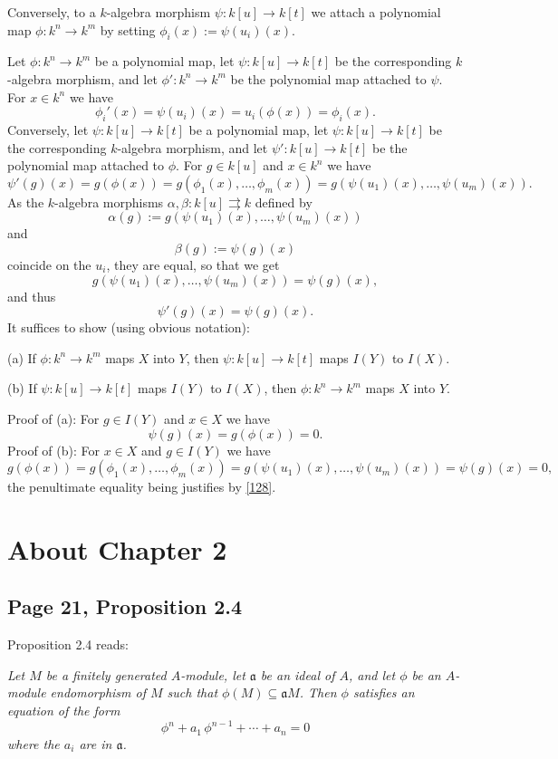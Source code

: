 \documentclass[parskip=half,fontsize=12pt]{scrartcl}%
\newcommand{\mf}{\mathfrak}
\newcommand{\aaa}{\mf a}
\begin{document}
Conversely, to a $k$-algebra morphism $\psi:k[u]\to k[t]$ we attach a polynomial map $\phi:k^n\to k^m$ by setting $\phi_i(x):=\psi(u_i)(x)$. 

Let $\phi:k^n\to k^m$ be a polynomial map, let $\psi:k[u]\to k[t]$ be the corresponding $k$-algebra morphism, and let $\phi':k^n\to k^m$ be the polynomial map attached to $\psi$. For $x\in k^n$ we have 
$$
\phi_i'(x)=\psi(u_i)(x)=u_i(\phi(x))=\phi_i(x).
$$ 
Conversely, let $\psi:k[u]\to k[t]$ be a polynomial map, let $\psi:k[u]\to k[t]$ be the corresponding $k$-algebra morphism, and let $\psi':k[u]\to k[t]$ be the polynomial map attached to $\phi$. For $g\in k[u]$ and $x\in k^n$ we have 
$$
\psi'(g)(x)=g(\phi(x))=g(\phi_1(x),\dots,\phi_m(x))=g(\psi(u_1)(x),\dots,\psi(u_m)(x)). 
$$ 
As the $k$-algebra morphisms $\alpha,\beta:k[u]\rightrightarrows k$ defined by 
$$
\alpha(g):=g(\psi(u_1)(x),\dots,\psi(u_m)(x))
$$ 
and 
$$
\beta(g):=\psi(g)(x)
$$ 
coincide on the $u_i$, they are equal, so that we get 
\begin{equation}\label{128}
g(\psi(u_1)(x),\dots,\psi(u_m)(x))=\psi(g)(x),
\end{equation}
and thus 
$$
\psi'(g)(x)=\psi(g)(x).
$$ 
It suffices to show (using obvious notation):

(a) If $\phi:k^n\to k^m$ maps $X$ into $Y$, then $\psi:k[u]\to k[t]$ maps $I(Y)$ to $I(X)$. 

(b) If $\psi:k[u]\to k[t]$ maps $I(Y)$ to $I(X)$, then $\phi:k^n\to k^m$ maps $X$ into $Y$. 

Proof of (a): For $g\in I(Y)$ and $x\in X$ we have 
$$
\psi(g)(x)=g(\phi(x))=0.
$$ 
Proof of (b): For $x\in X$ and $g\in I(Y)$ we have 
$$
g(\phi(x))=g(\phi_1(x),\dots,\phi_m(x))=g(\psi(u_1)(x),\dots,\psi(u_m)(x))=\psi(g)(x)=0,
$$ 
the penultimate equality being justifies by \eqref{128}.


\section{About Chapter 2}%

\subsection{Page 21, Proposition 2.4}\label{24}%

Proposition 2.4 reads:

\emph{Let $M$ be a finitely generated $A$-module, let $\mf a$ be an ideal of $A$, and let $\phi$ be an $A$-module endomorphism of $M$ such that $\phi(M)\subseteq\aaa M$. Then $\phi$ satisfies an equation of the form
$$
\phi^n+a_1\,\phi^{n-1}+\cdots+a_n=0
$$ 
where the $a_i$ are in $\mf a$.}
\end{document}
